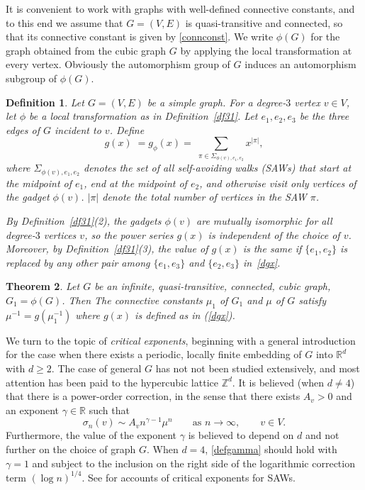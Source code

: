 \documentclass[12pt]{amsart}
\theoremstyle{plain}
\newtheorem{theorem}{Theorem}
\newtheorem{definition}[theorem]{Definition}
\numberwithin{equation}{section}
\numberwithin{theorem}{section}
\numberwithin{figure}{section}
\newcommand\s{\sigma}
\newcommand\oo{\infty}
\newcommand\ZZ{{\mathbb Z}}
\newcommand\RR{{\mathbb R}}
\newcommand\g{\gamma}
\begin{document}
It is convenient to work with graphs with well-defined connective constants, and
to this end we assume 
that $G=(V,E)$ is quasi-transitive and connected, so that its connective constant
is given by \eqref{connconst}.
We write $\phi(G)$ for the graph obtained
from the cubic graph $G$ by applying the local transformation at every vertex. 
Obviously the automorphism group of $G$ induces an automorphism subgroup
of $\phi(G)$. 

\begin{definition}\label{df32}
Let $G=(V,E)$ be a simple graph. For a degree-$3$ vertex $v\in V$, let $\phi$ be a local
transformation as in Definition~\ref{df31}. Let $e_1,e_2,e_3$ be the three edges of $G$
incident to $v$. Define
\begin{equation}\label{dgx}
g(x)\;=g_{\phi}(x)=\;\sum_{\pi\in \Sigma_{\phi(v),e_1,e_2}} x^{|\pi|},
\end{equation}
where $\Sigma_{\phi(v),e_1,e_2}$ denotes the set of all self-avoiding walks (SAWs) that
start at the midpoint of $e_1$, end at the midpoint of $e_2$, and otherwise visit only
vertices of the gadget $\phi(v)$. $|\pi|$ denote the total number of vertices in the SAW $\pi$.

By Definition~\ref{df31}(2), the gadgets $\phi(v)$ are mutually isomorphic for all
degree-$3$ vertices $v$, so the power series $g(x)$ is independent of the choice of $v$.
Moreover, by Definition~\ref{df31}(3), the value of $g(x)$ is the same if
$\{e_1,e_2\}$ is replaced by any other pair among
$\{e_1,e_3\}$ and $\{e_2,e_3\}$ in~\eqref{dgx}.
\end{definition}


\begin{theorem}\label{thm:main2}
Let $G$ be an infinite, quasi-transitive, connected, cubic graph,  $G_1 = \phi(G)$.
Then
 The connective constants $\mu_1$ of $G_1$ and $\mu$ of $G$ satisfy
$\mu^{-1} = g(\mu_{1}^{-1})$ where $g(x)$ is defined as in (\ref{dgx}).
\end{theorem}



We turn to the topic of \emph{critical exponents}, beginning with
a general introduction for the case when there exists a periodic, locally finite embedding
of $G$ into $\RR^d$ with $d \ge 2$. The case of general $G$ has not not been 
studied extensively, and most attention has been paid to the 
hypercubic lattice $\ZZ^d$.
It is believed 
 (when $d \ne 4$) that there is a power-order correction, 
in the sense that there exists $A_v>0$ and an exponent 
$\g \in \RR$ such that
\begin{equation}\label{defgamma}
\s_n(v)\sim A_v n^{\gamma-1}\mu^n \qquad \text{as } n \to\oo,
\qquad v \in V.
\end{equation}
Furthermore, 
the value of the exponent $\g$ is believed to depend on $d$ and not further on the 
choice of graph $G$.
When $d=4$, \eqref{defgamma} should hold with $\gamma=1$
and subject to the inclusion
on the right side of the logarithmic correction
term  $(\log n)^{1/4}$.
See \cite{bdgs,ms} for  accounts of critical exponents for SAWs.
\end{document}
